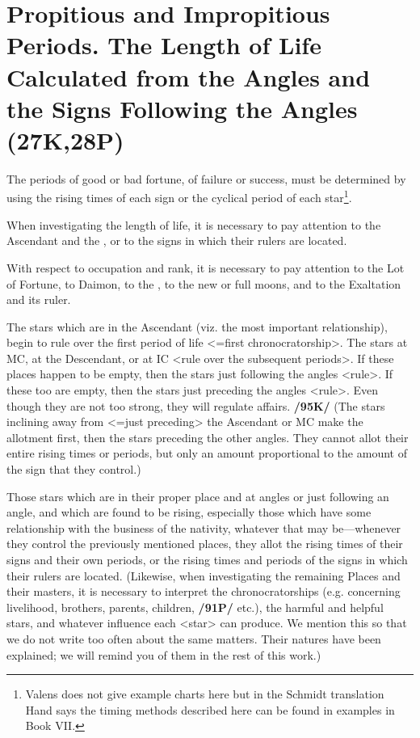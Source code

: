 \section{Propitious and Impropitious Periods. The Length of Life Calculated from the Angles and the Signs Following the Angles (27K,28P)}
The periods of good or bad fortune, of failure or success, must be determined by using the rising times of each sign or the cyclical period of each star\footnote{Valens does not give example charts here but in the Schmidt translation Hand says the timing methods described here can be found in examples in Book VII.}.

When investigating the length of life, it is necessary to pay attention to the Ascendant and the \Moon, or to the signs in which their rulers are located. 

With respect to occupation and rank, it is necessary to pay attention to the Lot of Fortune, to Daimon, to the \Sun, to the new or full moons, and to the Exaltation and its ruler. 

The stars which are in the Ascendant (viz. the most important relationship), begin to rule over the first period of life <=first chronocratorship>. The stars at MC, at the Descendant, or at IC <rule over the subsequent periods>. If these places happen to be empty, then the stars just following the angles <rule>. If these too are empty, then the stars just preceding the angles <rule>. Even though they are not too strong, they will regulate affairs. \textbf{/95K/} (The stars inclining away from <=just preceding> the Ascendant or MC make the allotment first, then the stars preceding the
other angles. They cannot allot their entire rising times or periods, but only an amount proportional to the amount of the sign that they control.) 

Those stars which are in their proper place and at angles or just following an angle, and which are found to be rising, especially those which have some relationship with the business of the nativity, whatever that may be—whenever they control the previously mentioned places, they allot the rising times of their signs and their own periods, or the rising times and periods of the signs in which their rulers are located. \mndl (Likewise, when investigating the remaining Places and their masters, it is necessary to interpret the chronocratorships (e.g. concerning livelihood, brothers, parents, children, \textbf{/91P/} etc.), the harmful and helpful stars, and whatever influence each <star> can produce. We mention this so that we do not write too often about the same matters. Their natures have been explained; we will remind you of them in the rest of this work.)

